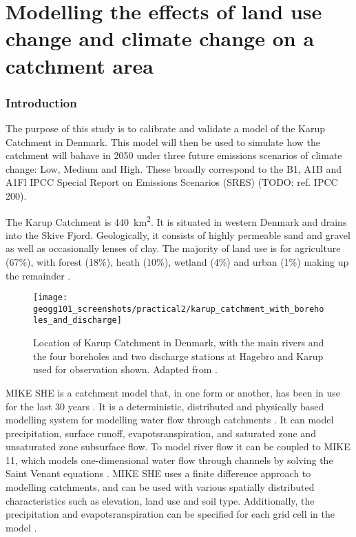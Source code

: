 \documentclass{article}
\begin{document}
\printbibliography[filter=practical1]

\newpage
\setcounter{section}{0}
\setcounter{figure}{0}

\part*{Modelling the effects of land use change and climate change on a catchment area}

\section{Introduction}

The purpose of this study is to calibrate and validate a model of the Karup Catchment in Denmark. This model will then be used to simulate how the catchment will bahave in 2050 under three future emissions scenarios of climate change: Low, Medium and High. These broadly correspond to the B1, A1B and A1Fl IPCC Special Report on Emissions Scenarios (SRES) (TODO: ref. IPCC 200).

The Karup Catchment is \SI{440}{km^2}. It is situated in western Denmark and drains into the Skive Fjord. Geologically, it consists of highly permeable sand and gravel as well as occasionally lenses of clay. 
The majority of land use is for agriculture (67\%), with forest (18\%), heath (10\%), wetland (4\%) and urban (1\%) making up the remainder \parencite{refsgaard1997parameterisation}.

\begin{figure}[!h]
    \centering
    \texttt{[image: geogg101\_screenshots/practical2/karup\_catchment\_with\_boreholes\_and\_discharge]}
    \caption{Location of Karup Catchment in Denmark, with the main rivers and the four boreholes and two discharge stations at Hagebro and Karup used for observation shown. Adapted from \textcite{blasone2008uncertainty}.}
    \label{fig:karup_catchment}
\end{figure}

MIKE SHE is a catchment model that, in one form or another, has been in use for the last 30 years \parencite{refsgaard2010systeme}. It is a deterministic, distributed and physically based modelling system for modelling water flow through catchments \parencite{refsgaard1995mike}. It can model precipitation, surface runoff, evapotsranspiration, and saturated zone and unsaturated zone subsurface flow. To model river flow it can be coupled to MIKE 11, which models one-dimensional water flow through channels by solving the Saint Venant equations \parencite{havno1995mike}.  
MIKE SHE uses a finite difference approach to modelling catchments, and can be used with various spatially distributed characteristics such as elevation, land use and soil type. Additionally, the precipitation and evapotsranspiration can be specified for each grid cell in the model \parencite{thompson2012modelling}.
\end{document}
